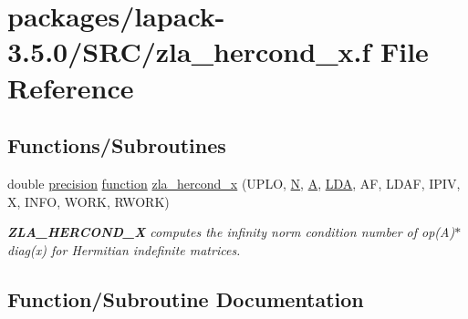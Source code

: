 \hypertarget{zla__hercond__x_8f}{}\section{packages/lapack-\/3.5.0/\+S\+R\+C/zla\+\_\+hercond\+\_\+x.f File Reference}
\label{zla__hercond__x_8f}
\subsection*{Functions/\+Subroutines}
\begin{DoxyCompactItemize}
\item 
double \hyperlink{numinquire_8h_a2c8e616467665d0b2814d4c1589ba74e}{precision} \hyperlink{afunc_8m_a7b5e596df91eadea6c537c0825e894a7}{function} \hyperlink{zla__hercond__x_8f_a57cd8e6f24c459a2de30a40e6ab78bd6}{zla\+\_\+hercond\+\_\+x} (U\+P\+L\+O, \hyperlink{polmisc_8c_a0240ac851181b84ac374872dc5434ee4}{N}, \hyperlink{classA}{A}, \hyperlink{example__user_8c_ae946da542ce0db94dced19b2ecefd1aa}{L\+D\+A}, A\+F, L\+D\+A\+F, I\+P\+I\+V, X, I\+N\+F\+O, W\+O\+R\+K, R\+W\+O\+R\+K)
\begin{DoxyCompactList}\small\item\em {\bfseries Z\+L\+A\+\_\+\+H\+E\+R\+C\+O\+N\+D\+\_\+\+X} computes the infinity norm condition number of op(\+A)$\ast$diag(x) for Hermitian indefinite matrices. \end{DoxyCompactList}\end{DoxyCompactItemize}


\subsection{Function/\+Subroutine Documentation}
\hypertarget{zla__hercond__x_8f_a57cd8e6f24c459a2de30a40e6ab78bd6}{}
